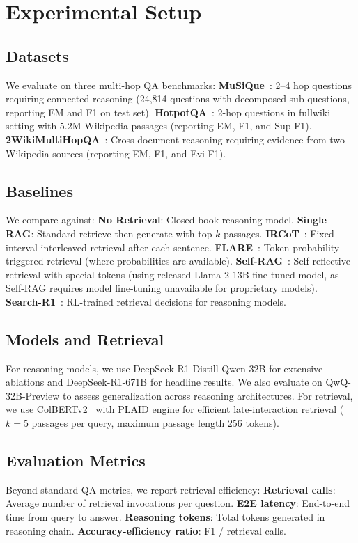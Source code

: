 \documentclass[sigconf,natbib=true]{acmart}
\begin{document}
\section{Experimental Setup}
\label{sec:setup}

\subsection{Datasets}
We evaluate on three multi-hop QA benchmarks: \textbf{MuSiQue}~\cite{trivedi2022musique}: 2--4 hop questions requiring connected reasoning (24,814 questions with decomposed sub-questions, reporting EM and F1 on test set). \textbf{HotpotQA}~\cite{yang2018hotpotqa}: 2-hop questions in fullwiki setting with 5.2M Wikipedia passages (reporting EM, F1, and Sup-F1). \textbf{2WikiMultiHopQA}~\cite{ho2020constructing}: Cross-document reasoning requiring evidence from two Wikipedia sources (reporting EM, F1, and Evi-F1).

\subsection{Baselines}
We compare against: \textbf{No Retrieval}: Closed-book reasoning model. \textbf{Single RAG}: Standard retrieve-then-generate with top-$k$ passages. \textbf{IRCoT}~\cite{trivedi2023ircot}: Fixed-interval interleaved retrieval after each sentence. \textbf{FLARE}~\cite{jiang2023flare}: Token-probability-triggered retrieval (where probabilities are available). \textbf{Self-RAG}~\cite{asai2024selfrag}: Self-reflective retrieval with special tokens (using released Llama-2-13B fine-tuned model, as Self-RAG requires model fine-tuning unavailable for proprietary models). \textbf{Search-R1}~\cite{jin2025searchr1}: RL-trained retrieval decisions for reasoning models.

\subsection{Models and Retrieval}
For reasoning models, we use DeepSeek-R1-Distill-Qwen-32B for extensive ablations and DeepSeek-R1-671B for headline results. We also evaluate on QwQ-32B-Preview to assess generalization across reasoning architectures. For retrieval, we use ColBERTv2~\cite{santhanam2022colbertv2} with PLAID engine for efficient late-interaction retrieval ($k=5$ passages per query, maximum passage length 256 tokens).

\subsection{Evaluation Metrics}
Beyond standard QA metrics, we report retrieval efficiency: \textbf{Retrieval calls}: Average number of retrieval invocations per question. \textbf{E2E latency}: End-to-end time from query to answer. \textbf{Reasoning tokens}: Total tokens generated in reasoning chain. \textbf{Accuracy-efficiency ratio}: F1 / retrieval calls.
\end{document}
